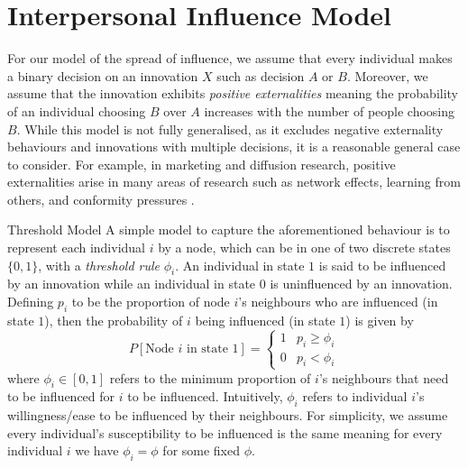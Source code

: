 \documentclass[10pt, oneside, reqno]{amsart}
\makeatletter
\theoremstyle{plain}%
\theoremstyle{definition}
\theoremstyle{remark}
\renewcommand\subsection{\@startsection{subsection}{2}%
  \z@{.5\linespacing\@plus.7\linespacing}{-.5em}%
  {\normalfont\scshape}}
\makeatother
\begin{document}




\section{Interpersonal Influence Model}

For our model of the spread of influence, we assume that every individual makes a binary decision
on an innovation $X$ such as decision $A$ or $B$. Moreover, we assume that the innovation exhibits \textit{positive externalities}
meaning the probability of an individual choosing $B$ over $A$ increases with the number of 
people choosing $B$. While this model is not fully generalised, as it excludes negative externality 
behaviours and innovations with multiple decisions, it is a reasonable general case to consider. 
For example, in marketing and diffusion research, positive externalities arise in many areas of 
research such as network effects, learning from others, and conformity 
pressures \cite{Influential}.

\subsection{Threshold Model}
A simple model to capture the aforementioned behaviour is to represent each individual $i$ by a node,
which can be in one of two discrete states $\{ 0, 1\}$, with a \textit{threshold rule} $\phi_i$. 
An individual in state $1$ is said to be influenced by an innovation while an 
individual in state $0$ is uninfluenced by an innovation.
Defining $p_i$ to be the proportion of node $i$'s neighbours who are influenced (in state $1$), then 
the probability of $i$ being influenced (in state $1$) is given by
\[ P[\text{Node } i \text{ in state } 1] = 
\begin{cases}
    1 & p_i \geq \phi_i \\
    0 & p_i < \phi_i
\end{cases} \tag{Threshold Rule} \]
where $\phi_i \in [0,1]$ refers to the minimum proportion of $i$'s neighbours that need to be influenced for $i$ to be influenced. 
Intuitively, $\phi_i$ refers to individual $i$'s willingness/ease to be influenced by their neighbours.
For simplicity, we assume every individual's susceptibility to be influenced is the same meaning for every individual $i$ we have $\phi_i = \phi$ for some fixed $\phi$.
\end{document}
